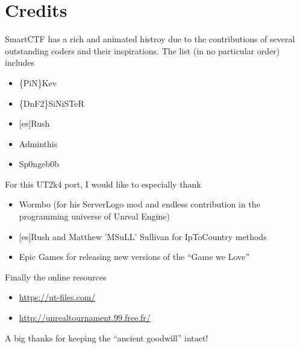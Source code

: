 \documentclass{article}
\begin{document}
\section{Credits}
SmartCTF has a rich and animated histroy due to the contributions of several outstanding coders and their inspirations.  The list (in no particular order) includes
\begin{itemize}
\item \{PiN\}Kev
\item \{DnF2\}SiNiSTeR
\item {[es]}Rush
\item Adminthis
\item Sp0ngeb0b 
\end{itemize}

For this UT2k4 port, I would like to especially thank
\begin{itemize}
\item Wormbo (for his ServerLogo mod and endless contribution in the programming universe of Unreal Engine)
\item {[es]}Rush and Matthew 'MSuLL' Sullivan for IpToCountry methods
\item Epic Games for releasing new versions of the ``Game we Love''
\end{itemize}

Finally the online resources
\begin{itemize}
\item \href{https://ut-files.com/}{{\color{Blue}https://ut-files.com/}}
\item \href{http://unrealtournament.99.free.fr/}{{\color{Blue}http://unrealtournament.99.free.fr/}}
\end{itemize}
A big thanks for keeping the ``ancient goodwill'' intact!
\end{document}
